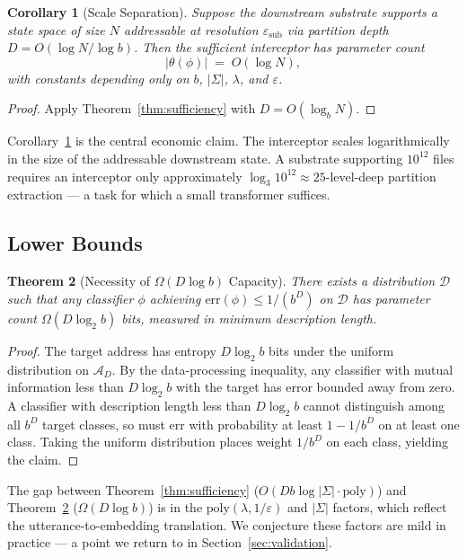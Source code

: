 \documentclass[11pt,twocolumn,a4paper]{article}
\newtheorem{theorem}{Theorem}[section]
\newtheorem{corollary}[theorem]{Corollary}
\theoremstyle{definition}
\theoremstyle{remark}
\begin{document}
\begin{corollary}[Scale Separation]
\label{cor:scale}
Suppose the downstream substrate supports a state space of size $N$ addressable at resolution $\varepsilon_{\text{sub}}$ via partition depth $D = O(\log N / \log b)$. Then the sufficient interceptor has parameter count
\[
|\theta(\phi)| \;=\; O(\log N),
\]
with constants depending only on $b$, $|\Sigma|$, $\lambda$, and $\varepsilon$.
\end{corollary}

\begin{proof}
Apply Theorem~\ref{thm:sufficiency} with $D = O(\log_b N)$.
\end{proof}

Corollary~\ref{cor:scale} is the central economic claim. The interceptor scales logarithmically in the size of the addressable downstream state. A substrate supporting $10^{12}$ files requires an interceptor only approximately $\log_3 10^{12} \approx 25$-level-deep partition extraction --- a task for which a small transformer suffices.

\subsection{Lower Bounds}

\begin{theorem}[Necessity of $\Omega(D \log b)$ Capacity]
\label{thm:necessity}
There exists a distribution $\mathcal{D}$ such that any classifier $\phi$ achieving $\mathrm{err}(\phi) \leq 1/(b^D)$ on $\mathcal{D}$ has parameter count $\Omega(D \log_2 b)$ bits, measured in minimum description length.
\end{theorem}

\begin{proof}
The target address has entropy $D \log_2 b$ bits under the uniform distribution on $\mathcal{A}_D$. By the data-processing inequality, any classifier with mutual information less than $D \log_2 b$ with the target has error bounded away from zero. A classifier with description length less than $D \log_2 b$ cannot distinguish among all $b^D$ target classes, so must err with probability at least $1 - 1/b^D$ on at least one class. Taking the uniform distribution places weight $1/b^D$ on each class, yielding the claim.
\end{proof}

The gap between Theorem~\ref{thm:sufficiency} ($O(D b \log |\Sigma| \cdot \mathrm{poly})$) and Theorem~\ref{thm:necessity} ($\Omega(D \log b)$) is in the $\mathrm{poly}(\lambda, 1/\varepsilon)$ and $|\Sigma|$ factors, which reflect the utterance-to-embedding translation. We conjecture these factors are mild in practice --- a point we return to in Section~\ref{sec:validation}.
\end{document}
